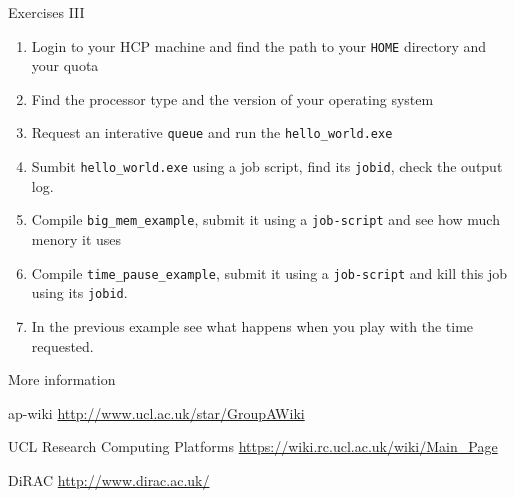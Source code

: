 \documentclass{beamer}
\begin{document}
\begin{frame}{Exercises III}
  \fontsize{10pt}{8}\selectfont
  \begin{enumerate}
    \item Login to your HCP machine and find the path to your \texttt{HOME}
    directory and your quota
    \item Find the processor type and the version of your operating system
    \item Request an interative \texttt{queue} and run the \texttt{hello\_world.exe}
    \item Sumbit \texttt{hello\_world.exe} using a job script, find its \texttt{jobid}, check the output log.
    \item Compile \texttt{big\_mem\_example}, submit it using a \texttt{job-script} and see how much menory it uses
    \item Compile \texttt{time\_pause\_example}, submit it using a \texttt{job-script} and kill this job using its \texttt{jobid}.
    \item In the previous example see what happens when you play with the time requested.
  \end{enumerate}
\end{frame}


\begin{frame}{More information}
  \begin{block}{ap-wiki}
    \url{http://www.ucl.ac.uk/star/GroupAWiki}
  \end{block}

  \begin{block}{UCL Research Computing Platforms}
    \url{https://wiki.rc.ucl.ac.uk/wiki/Main_Page}
  \end{block}

  \begin{block}{DiRAC}
    \url{http://www.dirac.ac.uk/}
  \end{block}
\end{frame}
\end{document}
